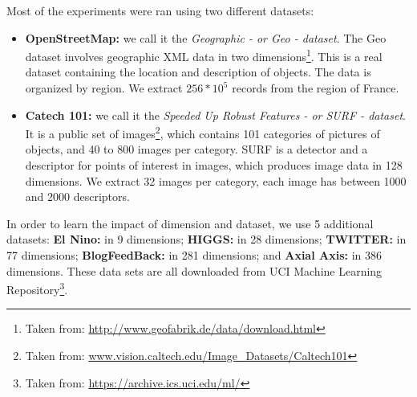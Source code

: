 Most of the experiments were ran using two different datasets: 

\begin{itemize}

\item \textbf{OpenStreetMap: }we call it the \emph{Geographic - or Geo - dataset}. The Geo dataset  
involves geographic XML data in two dimensions\footnote{Taken from: \url{http://www.geofabrik.de/data/download.html}}. 
This is a real dataset containing the location and description of objects. The data is organized by region. We extract 
$256*10^5$ records from the region of France.

\item \textbf{Catech 101: }we call it the \emph{Speeded Up Robust Features - or SURF - dataset}. It is a public set of images\footnote{Taken from: \url{www.vision.caltech.edu/Image_Datasets/Caltech101}}, which contains 101 categories of pictures of objects, and 40 to 800 images per category. 
SURF\cite{Surf} is a detector and a descriptor for points of interest in images, which produces image data
in 128 dimensions.  We extract 32 images per category, each image has between 1000 and 2000 descriptors.

\end{itemize}

In order to learn the impact of dimension and dataset, we use 5 additional datasets: \textbf{El Nino: } in 9 dimensions; \textbf{HIGGS: } in 28 dimensions; \textbf{TWITTER: } in 77 dimensions; \textbf{BlogFeedBack: } in 281 dimensions; and \textbf{Axial Axis: } in 386 dimensions. These data sets are all downloaded from UCI Machine Learning Repository\footnote{Taken from: \url{https://archive.ics.uci.edu/ml/}}.


